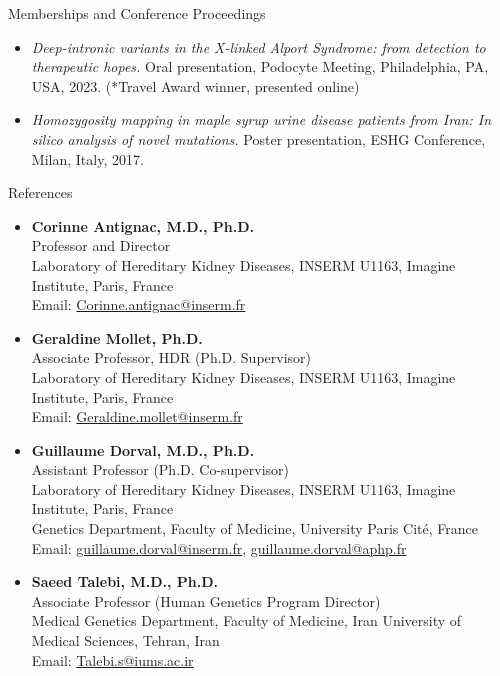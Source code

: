 \documentclass[
	11pt, %
]{resume} %
\begin{document}
\begin{rSection}{Memberships and Conference Proceedings}
\begin{itemize}
  \item \textit{Deep-intronic variants in the X-linked Alport Syndrome: from detection to therapeutic hopes.} Oral presentation, Podocyte Meeting, Philadelphia, PA, USA, 2023. (*Travel Award winner, presented online)
  \item \textit{Homozygosity mapping in maple syrup urine disease patients from Iran: In silico analysis of novel mutations.} Poster presentation, ESHG Conference, Milan, Italy, 2017.
\end{itemize}
\end{rSection}


\begin{rSection}{References}

\begin{itemize}
  \item \textbf{Corinne Antignac, M.D., Ph.D.} \\
  Professor and Director \\
  Laboratory of Hereditary Kidney Diseases, INSERM U1163, Imagine Institute, Paris, France \\
  Email: \href{mailto:Corinne.antignac@inserm.fr}{Corinne.antignac@inserm.fr}

  \item \textbf{Geraldine Mollet, Ph.D.} \\
  Associate Professor, HDR (Ph.D. Supervisor) \\
  Laboratory of Hereditary Kidney Diseases, INSERM U1163, Imagine Institute, Paris, France \\
  Email: \href{mailto:Geraldine.mollet@inserm.fr}{Geraldine.mollet@inserm.fr}

  \item \textbf{Guillaume Dorval, M.D., Ph.D.} \\
  Assistant Professor (Ph.D. Co-supervisor) \\
  Laboratory of Hereditary Kidney Diseases, INSERM U1163, Imagine Institute, Paris, France \\
  Genetics Department, Faculty of Medicine, University Paris Cité, France \\
  Email: \href{mailto:guillaume.dorval@inserm.fr}{guillaume.dorval@inserm.fr}, 
  \href{mailto:guillaume.dorval@aphp.fr}{guillaume.dorval@aphp.fr}

  \item \textbf{Saeed Talebi, M.D., Ph.D.} \\
  Associate Professor (Human Genetics Program Director) \\
  Medical Genetics Department, Faculty of Medicine, Iran University of Medical Sciences, Tehran, Iran \\
  Email: \href{mailto:Talebi.s@iums.ac.ir}{Talebi.s@iums.ac.ir}
\end{itemize}

\end{rSection}

\end{document}
